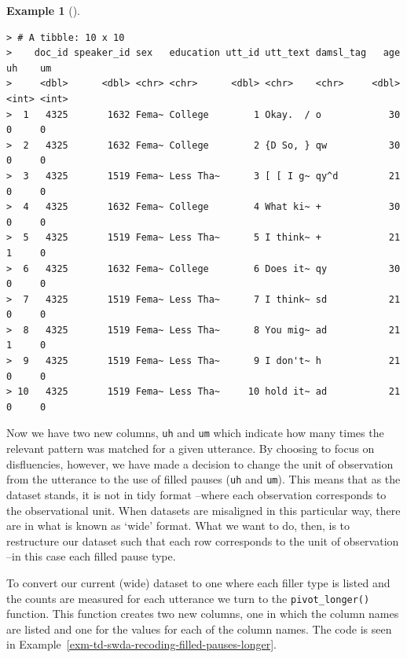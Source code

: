 \documentclass[
  letterpaper,
  DIV=11,
  numbers=noendperiod]{scrreport}
\theoremstyle{definition}
\newtheorem{example}{Example}[chapter]
\theoremstyle{remark}
\begin{document}
\begin{example}[]
\begin{verbatim}
> # A tibble: 10 x 10
>    doc_id speaker_id sex   education utt_id utt_text damsl_tag   age    uh    um
>     <dbl>      <dbl> <chr> <chr>      <dbl> <chr>    <chr>     <dbl> <int> <int>
>  1   4325       1632 Fema~ College        1 Okay.  / o            30     0     0
>  2   4325       1632 Fema~ College        2 {D So, } qw           30     0     0
>  3   4325       1519 Fema~ Less Tha~      3 [ [ I g~ qy^d         21     0     0
>  4   4325       1632 Fema~ College        4 What ki~ +            30     0     0
>  5   4325       1519 Fema~ Less Tha~      5 I think~ +            21     1     0
>  6   4325       1632 Fema~ College        6 Does it~ qy           30     0     0
>  7   4325       1519 Fema~ Less Tha~      7 I think~ sd           21     0     0
>  8   4325       1519 Fema~ Less Tha~      8 You mig~ ad           21     1     0
>  9   4325       1519 Fema~ Less Tha~      9 I don't~ h            21     0     0
> 10   4325       1519 Fema~ Less Tha~     10 hold it~ ad           21     0     0
\end{verbatim}

\end{example}

Now we have two new columns, \texttt{uh} and \texttt{um} which indicate
how many times the relevant pattern was matched for a given utterance.
By choosing to focus on disfluencies, however, we have made a decision
to change the unit of observation from the utterance to the use of
filled pauses (\texttt{uh} and \texttt{um}). This means that as the
dataset stands, it is not in tidy format --where each observation
corresponds to the observational unit. When datasets are misaligned in
this particular way, there are in what is known as `wide' format. What
we want to do, then, is to restructure our dataset such that each row
corresponds to the unit of observation --in this case each filled pause
type.

To convert our current (wide) dataset to one where each filler type is
listed and the counts are measured for each utterance we turn to the
\texttt{pivot\_longer()} function. This function creates two new
columns, one in which the column names are listed and one for the values
for each of the column names. The code is seen in
Example~\ref{exm-td-swda-recoding-filled-pauses-longer}.
\end{document}
